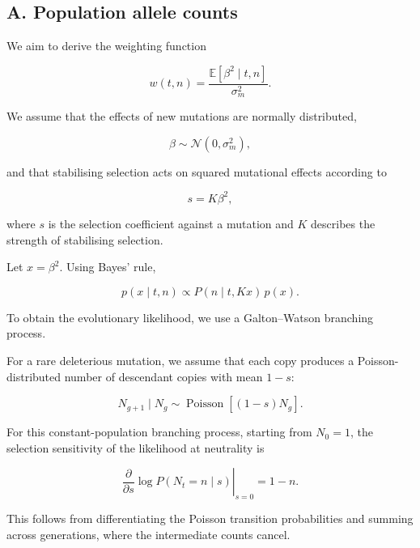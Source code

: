 \documentclass{article}
\begin{document}
\subsection{A. Population allele counts}

We aim to derive the weighting function

\begin{equation}
w(t,n)=
\frac{\mathbb{E}[\beta^2\mid t,n]}{\sigma_m^2}.
\end{equation}

We assume that the effects of new mutations are normally distributed,

\begin{equation}
\beta\sim\mathcal{N}(0,\sigma_m^2),
\end{equation}

and that stabilising selection acts on squared mutational effects according to

\begin{equation}
s=K\beta^2,
\end{equation}

where $s$ is the selection coefficient against a mutation and $K$ describes the strength of stabilising selection.

Let $x=\beta^2$. Using Bayes' rule,

\begin{equation}
p(x\mid t,n)
\propto P(n\mid t,Kx)\,p(x).
\end{equation}

To obtain the evolutionary likelihood, we use a Galton--Watson branching process.

For a rare deleterious mutation, we assume that each copy produces a Poisson-distributed number of descendant copies with mean $1-s$:

\begin{equation}
N_{g+1}\mid N_g
\sim\operatorname{Poisson}[(1-s)N_g].
\end{equation}

For this constant-population branching process, starting from $N_0=1$, the selection sensitivity of the likelihood at neutrality is

\begin{equation}
\left.
\frac{\partial}{\partial s}
\log P(N_t=n\mid s)
\right|_{s=0}
=1-n.
\end{equation}

This follows from differentiating the Poisson transition probabilities and summing across generations, where the intermediate counts cancel.
\end{document}
